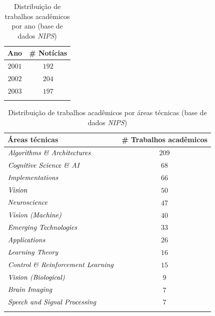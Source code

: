 \documentclass[
    12pt,                %
    oneside,            %
    a4paper,            %
    english,            %
    brazil                %
    ]{abntex2ppgsi}
\begin{document}
\begin{table}[h]
\centering
\caption{Distribuição de trabalhos acadêmicos por ano (base de dados \textit{NIPS})}
    \begin{tabular}{cc}
        \hline
        \textbf{Ano} & \# \textbf{Notícias} \\
        \hline
        $2001$ & $192$ \\
        $2002$ & $204$ \\
        $2003$ & $197$ \\
        \hline
        & \\
    \end{tabular}
    \label{tab:nips:distano}
\end{table}

\begin{table}[h]
    \centering
    \caption{Distribuição de trabalhos acadêmicos por áreas técnicas (base de dados \textit{NIPS})}
    \begin{tabular}{lc}
    \hline
        \textbf{Áreas técnicas} & \textbf{\# Trabalhos acadêmicos} \\
        \hline
        $\text{\textit{Algorithms \& Architectures}}$       & $209$ \\
        $\text{\textit{Cognitive Science \& AI}}$           & $68$  \\
        $\text{\textit{Implementations}}$                   & $66$  \\
        $\text{\textit{Vision}}$                            & $50$  \\
        $\text{\textit{Neuroscience}}$                      & $47$  \\
        $\text{\textit{Vision (Machine)}}$                  & $40$  \\
        $\text{\textit{Emerging Technologies}}$             & $33$  \\
        $\text{\textit{Applications}}$                      & $26$  \\
        $\text{\textit{Learning Theory}}$                   & $16$  \\
        $\text{\textit{Control \& Reinforcement Learning}}$ & $15$  \\
        $\text{\textit{Vision (Biological)}}$               & $9$   \\
        $\text{\textit{Brain Imaging}}$                     & $7$   \\
        $\text{\textit{Speech and Signal Processing}}$      & $7$   \\
        \hline
        & \\
    \end{tabular}
    \label{tab:nips:distpapers}
\end{table}
\end{document}
